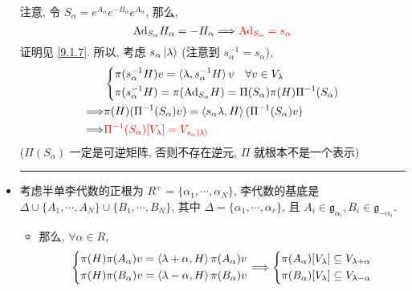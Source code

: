 \begin{itemize}
	\begin{tcolorbox}[title=proof:]
		注意, 令 $S_\alpha = e^{A_\alpha} e^{- B_\alpha} e^{A_\alpha}$, 那么,
		\begin{equation}
			\mathrm{Ad}_{S_\alpha} H_\alpha = - H_\alpha \Longrightarrow \mathcolor{red}{\mathrm{Ad}_{S_\alpha} = s_\alpha}
		\end{equation}
		证明见 \eqref{9.1.7}. 所以, 考虑 $s_\alpha \ket{\lambda}$ (注意到 $s_\alpha^{- 1} = s_\alpha$),
		\begin{align}
			& \begin{dcases}
				\pi(s_\alpha^{- 1} H) v = \braket{\lambda, s_\alpha^{- 1} H} v \quad \forall v \in V_\lambda \\
				\pi(s_\alpha^{- 1} H) = \pi(\mathrm{Ad}_{S_\alpha} H) = \Pi(S_\alpha) \pi(H) \Pi^{- 1}(S_\alpha)
			\end{dcases} \notag \\
			\Longrightarrow & \pi(H) (\Pi^{- 1}(S_\alpha) v) = \braket{s_\alpha \lambda, H} (\Pi^{- 1}(S_\alpha) v) \notag \\
			\Longrightarrow & \mathcolor{red}{\Pi^{- 1}(S_\alpha)[V_\lambda] = V_{s_\alpha \ket{\lambda}}}
		\end{align}
		($\Pi(S_\alpha)$ 一定是可逆矩阵, 否则不存在逆元, $\Pi$ 就根本不是一个表示)
	\end{tcolorbox}
	
	\noindent\rule[0.5ex]{\linewidth}{0.5pt} %
	
	\item 考虑半单李代数的正根为 $R^+ = \{\alpha_1, \cdots, \alpha_N\}$, 李代数的基底是 $\Delta \cup \{A_1, \cdots, A_N\} \cup \{B_1, \cdots, B_N\}$, 其中 $\Delta = \{\alpha_1, \cdots, \alpha_r\}$, 且 $A_i \in \mathfrak{g}_{\alpha_i}, B_i \in \mathfrak{g}_{- \alpha_i}$.
	\begin{itemize}
		\item 那么, $\forall \alpha \in R$,
		\begin{equation} \label{8.1.5}
			\begin{dcases}
				\pi(H) \pi(A_\alpha) v = \braket{\lambda + \alpha, H} \pi(A_\alpha) v \\
				\pi(H) \pi(B_\alpha) v = \braket{\lambda - \alpha, H} \pi(B_\alpha) v
			\end{dcases} \Longrightarrow \begin{dcases}
				\pi(A_\alpha)[V_\lambda] \subseteq V_{\lambda + \alpha} \\
				\pi(B_\alpha)[V_\lambda] \subseteq V_{\lambda - \alpha}
			\end{dcases}
		\end{equation}
		

\end{itemize}
\end{itemize}
